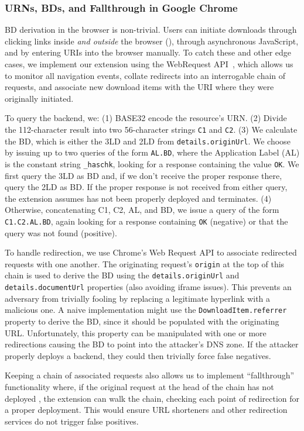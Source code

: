 \subsubsection{URNs, BDs, and Fallthrough in Google Chrome}

BD derivation in the browser is non-trivial. Users can initiate downloads
through clicking links inside \emph{and outside} the browser (), through asynchronous JavaScript, and by entering URIs into the
browser manually. To catch these and other edge cases, we implement our
extension using the WebRequest API~\cite{ExtensionAPI}, which allows us to
monitor all navigation events, collate redirects into an interrogable chain of
requests, and associate new download items with the URI where they were
originally initiated.

To query the backend, we: (1) BASE32 encode the resource's URN. (2) Divide the
112-character result into two 56-character strings \texttt{C1} and \texttt{C2}.
(3) We calculate the BD, which is either the 3LD and 2LD from
\texttt{details.originUrl}. We choose by issuing up to two queries of the form
\texttt{AL.BD}, where the Application Label (AL) is the constant string
\texttt{\_haschk}, looking for a response containing the value \texttt{OK}. We
first query the 3LD as BD and, if we don't receive the proper response there,
query the 2LD as BD. If the proper response is not received from either query,
the extension assumes \SYSTEM{} has not been properly deployed and terminates.
(4) Otherwise, concatenating C1, C2, AL, and BD, we issue a query of the form
\texttt{C1.C2.AL.BD}, again looking for a response containing \texttt{OK}
(negative) or that the query was not found (positive).

To handle redirection, we use Chrome's Web Request API to associate redirected
requests with one another. The originating request's \texttt{origin} at the top
of this chain is used to derive the BD using the \texttt{details.originUrl} and
\texttt{details.documentUrl} properties (also avoiding iframe issues). This
prevents an adversary from trivially fooling \SYSTEM{} by replacing a legitimate
hyperlink with a malicious one. A naive implementation might use the
\texttt{DownloadItem.referrer} property to derive the BD, since it should be
populated with the originating URL. Unfortunately, this property can be
manipulated with one or more redirections causing the BD to point into the
attacker's DNS zone. If the attacker properly deploys a \SYSTEM{} backend, they
could then trivially force false negatives.

Keeping a chain of associated requests also allows us to implement
``fallthrough'' functionality where, if the original request at the head of the
chain has not deployed \SYSTEM{}, the extension can walk the chain, checking
each point of redirection for a proper \SYSTEM{} deployment. This would ensure
URL shorteners and other redirection services do not trigger false positives.
